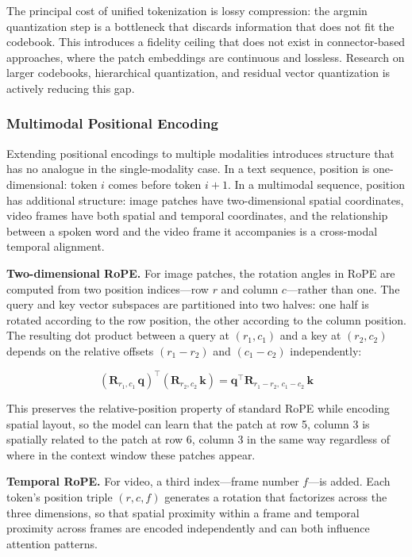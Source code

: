 \documentclass{book}
\begin{document}
The principal cost of unified tokenization is lossy compression: the argmin
quantization step is a bottleneck that discards information that does not fit
the codebook. This introduces a fidelity ceiling that does not exist in
connector-based approaches, where the patch embeddings are continuous and lossless.
Research on larger codebooks, hierarchical quantization, and residual vector
quantization is actively reducing this gap.

\subsubsection*{Multimodal Positional Encoding}

Extending positional encodings to multiple modalities introduces structure that
has no analogue in the single-modality case. In a text sequence, position is
one-dimensional: token $i$ comes before token $i+1$. In a multimodal sequence,
position has additional structure: image patches have two-dimensional spatial
coordinates, video frames have both spatial and temporal coordinates, and the
relationship between a spoken word and the video frame it accompanies is a
cross-modal temporal alignment.

\textbf{Two-dimensional RoPE.} For image patches, the rotation angles in RoPE
are computed from two position indices---row $r$ and column $c$---rather than
one. The query and key vector subspaces are partitioned into two halves: one
half is rotated according to the row position, the other according to the
column position. The resulting dot product between a query at $(r_1, c_1)$ and
a key at $(r_2, c_2)$ depends on the relative offsets $(r_1 - r_2)$ and
$(c_1 - c_2)$ independently:

\begin{equation}
\left(\mathbf{R}_{r_1,c_1}\, \mathbf{q}\right)^\top
\left(\mathbf{R}_{r_2,c_2}\, \mathbf{k}\right)
= \mathbf{q}^\top \mathbf{R}_{r_1-r_2,\,c_1-c_2}\, \mathbf{k}
\end{equation}

This preserves the relative-position property of standard RoPE while
encoding spatial layout, so the model can learn that the patch at row 5,
column 3 is spatially related to the patch at row 6, column 3 in the same
way regardless of where in the context window these patches appear.

\textbf{Temporal RoPE.} For video, a third index---frame number $f$---is
added. Each token's position triple $(r, c, f)$ generates a rotation that
factorizes across the three dimensions, so that spatial proximity within a
frame and temporal proximity across frames are encoded independently and
can both influence attention patterns.
\end{document}

